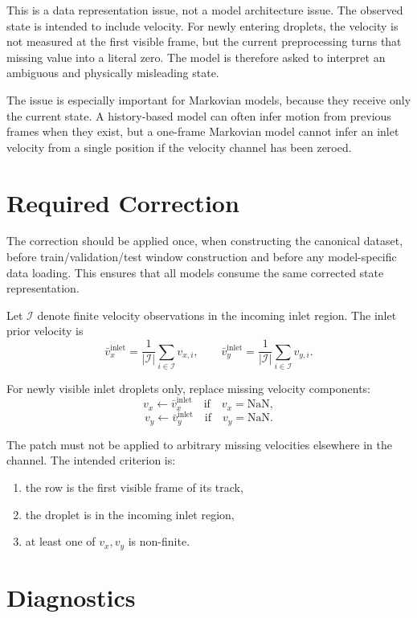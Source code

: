 \documentclass[11pt]{article}
\begin{document}
This is a data representation issue, not a model architecture issue. The
observed state is intended to include velocity. For newly entering droplets,
the velocity is not measured at the first visible frame, but the current
preprocessing turns that missing value into a literal zero. The model is
therefore asked to interpret an ambiguous and physically misleading state.

The issue is especially important for Markovian models, because they receive
only the current state. A history-based model can often infer motion from
previous frames when they exist, but a one-frame Markovian model cannot infer
an inlet velocity from a single position if the velocity channel has been
zeroed.

\section{Required Correction}

The correction should be applied once, when constructing the canonical dataset,
before train/validation/test window construction and before any model-specific
data loading. This ensures that all models consume the same corrected state
representation.

Let \(\mathcal{I}\) denote finite velocity observations in the incoming inlet
region. The inlet prior velocity is
\[
    \bar{v}_x^{\mathrm{inlet}}
    =
    \frac{1}{|\mathcal{I}|}
    \sum_{i \in \mathcal{I}} v_{x,i},
    \qquad
    \bar{v}_y^{\mathrm{inlet}}
    =
    \frac{1}{|\mathcal{I}|}
    \sum_{i \in \mathcal{I}} v_{y,i}.
\]

For newly visible inlet droplets only, replace missing velocity components:
\[
    v_x \leftarrow \bar{v}_x^{\mathrm{inlet}}
    \quad \mathrm{if}\quad v_x=\mathrm{NaN},
\]
\[
    v_y \leftarrow \bar{v}_y^{\mathrm{inlet}}
    \quad \mathrm{if}\quad v_y=\mathrm{NaN}.
\]

The patch must not be applied to arbitrary missing velocities elsewhere in the
channel. The intended criterion is:
\begin{enumerate}
    \item the row is the first visible frame of its track,
    \item the droplet is in the incoming inlet region,
    \item at least one of \(v_x, v_y\) is non-finite.
\end{enumerate}

\section{Diagnostics}
\end{document}

